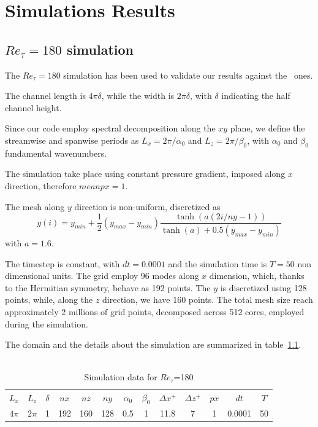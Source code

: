 \chapter{Simulations Results}
\section{$Re_{\tau}=180$ simulation}

The $Re_{\tau}=180$ simulation has been used to validate our results against the~\cite{kim_moin_moser} ones. \par

The channel length is $4\pi \delta$, while the width is $2 \pi \delta$, with $\delta$ indicating the half channel height. \par
Since our code employ spectral decomposition along the $xy$ plane, we define the streamwise and spanwise periods as $L_{x}= 2\pi /\alpha_{0}$ and $L_{z}=2\pi /\beta_{0}$, with $\alpha_{0}$ and $\beta_{0}$ fundamental wavenumbers. \par
The simulation take place using constant pressure gradient, imposed along $x$ direction, therefore $meanpx=1$.\par
The mesh along $y$ direction is non-uniform, discretized as
\begin{equation*}
y(i)=y_{min}+\frac{1}{2}(y_{max}-y_{min})  \frac{\tanh(a(2i/ny-1))}{\tanh(a)+0.5(y_{max}-y_{min})}
\end{equation*}
with $a=1.6$.\par
The timestep is constant, with $dt=0.0001$ and the simulation time is $T=50$ non dimensional units.
The grid employ 96 modes along $x$ dimension, which, thanks to the Hermitian symmetry, behave as 192 points. The $y$ is discretized using 128 points, while, along the $z$ direction, we have 160 points. The total mesh size reach approximately 2 millions of grid points, decomposed across 512 cores, employed during the simulation. 

The domain and the details about the simulation are summarized in table~\ref{table:180}.\\~\par
\begin{table}[h]
\caption{Simulation data for $Re_{\tau}$=180}
\begin{center}
\begin{tabular}{ccccccccccccc}
\toprule
$L_{x}$ & $L_{z}$ & $\delta$ & $nx$ & $nz$ & $ny$ & $\alpha_{0}$ & $\beta_{0}$ & $\Delta x^{+}$ & $\Delta z^{+}$ & $px$ & $dt$ & $T$\\
$4\pi$ & $2\pi$ & 1 & 192 & 160 & 128 & 0.5 & 1 & 11.8  & 7 & 1 & 0.0001 & 50 \\
\bottomrule
\end{tabular}
\end{center}
\label{table:180}
\end{table}

